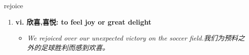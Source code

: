 
\begin{frame}
{\huge rejoice}
\begin{center}
\begin{enumerate}\Large
  \item \textbf{vi. 欣喜,喜悦: to feel joy or great delight}
  \begin{itemize}
    \item \em{\Large{We rejoiced over our unexpected victory on the soccer field.我们为预料之外的足球胜利而感到欢喜。}}
  \end{itemize}
\end{enumerate}
\end{center}
\end{frame}
